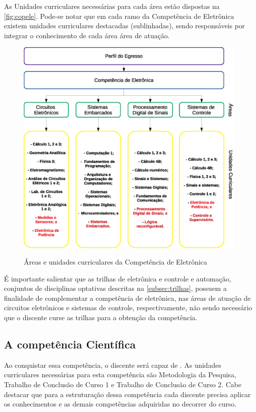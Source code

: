 As Unidades curriculares necessárias para cada área estão dispostas na \autoref{fig:copele}. Pode-se notar que em cada ramo da Competência de Eletrônica existem unidades curriculares destacadas (sublinhadas), sendo responsáveis por integrar o conhecimento de cada área área de atuação.

\begin{figure}[!htb]
    \centering
    \caption[Áreas e unidades curriculares da Competência de Eletrônica]{Áreas e unidades curriculares da Competência de Eletrônica}
    \includegraphics[width=1.0\textwidth]{Caps/Figs/comp_eletronica.eps}
    \fonte{\utf}
    \label{fig:copele}
\end{figure}

É importante salientar que as trilhas de eletrônica e controle e automação, conjuntos de disciplinas optativas descritas na \autoref{subsec:trilhas}, possuem a finalidade de complementar a competência de eletrônica, nas áreas de atuação de circuitos eletrônicos e sistemas de controle, respectivamente, não sendo necessário que o discente curse as trilhas para a obtenção da competência.

\subsection{A competência Científica}

Ao conquistar essa competência, o discente será capaz de \textbf{\compCien}. As unidades curriculares necessárias para esta competência são Metodologia da Pesquisa, Trabalho de Conclusão de Curso 1 e Trabalho de Conclusão de Curso 2. Cabe destacar que para a estruturação dessa competência cada discente precisa aplicar os conhecimentos e as demais competências adquiridas no decorrer do curso.

